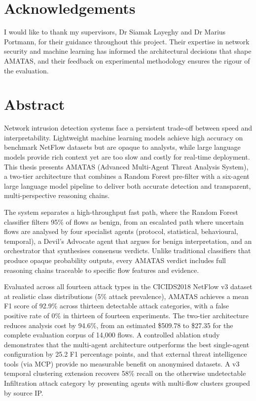 \documentclass[12pt,openany,oneside,a4paper]{book}
\begin{document}
\chapter{Acknowledgements}

I would like to thank my supervisors, Dr Siamak Layeghy and Dr Marius Portmann, for their guidance throughout this project. Their expertise in network security and machine learning has informed the architectural decisions that shape AMATAS, and their feedback on experimental methodology ensures the rigour of the evaluation.

\chapter{Abstract}

Network intrusion detection systems face a persistent trade-off between speed and interpretability. Lightweight machine learning models achieve high accuracy on benchmark NetFlow datasets but are opaque to analysts, while large language models provide rich context yet are too slow and costly for real-time deployment. This thesis presents AMATAS (Advanced Multi-Agent Threat Analysis System), a two-tier architecture that combines a Random Forest pre-filter with a six-agent large language model pipeline to deliver both accurate detection and transparent, multi-perspective reasoning chains.

The system separates a high-throughput fast path, where the Random Forest classifier filters 95\% of flows as benign, from an escalated path where uncertain flows are analysed by four specialist agents (protocol, statistical, behavioural, temporal), a Devil's Advocate agent that argues for benign interpretation, and an orchestrator that synthesises consensus verdicts. Unlike traditional classifiers that produce opaque probability outputs, every AMATAS verdict includes full reasoning chains traceable to specific flow features and evidence.

Evaluated across all fourteen attack types in the CICIDS2018 NetFlow v3 dataset at realistic class distributions (5\% attack prevalence), AMATAS achieves a mean F1 score of 92.9\% across thirteen detectable attack categories, with a false positive rate of 0\% in thirteen of fourteen experiments. The two-tier architecture reduces analysis cost by 94.6\%, from an estimated \$509.78 to \$27.35 for the complete evaluation corpus of 14,000 flows. A controlled ablation study demonstrates that the multi-agent architecture outperforms the best single-agent configuration by 25.2 F1 percentage points, and that external threat intelligence tools (via MCP) provide no measurable benefit on anonymised datasets. A v3 temporal clustering extension recovers 58\% recall on the otherwise undetectable Infiltration attack category by presenting agents with multi-flow clusters grouped by source IP.
\end{document}
